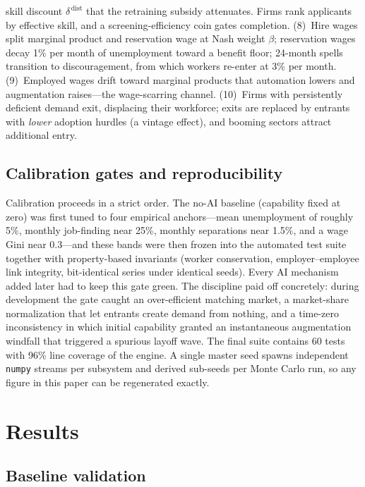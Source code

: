 \documentclass[11pt,a4paper]{article}
\begin{document}
skill discount $\delta^{\,\text{dist}}$ that the retraining subsidy attenuates. Firms
rank applicants by effective skill, and a screening-efficiency coin gates completion.
(8)~Hire wages split marginal product and reservation wage at Nash weight $\beta$;
reservation wages decay 1\% per month of unemployment toward a benefit floor;
24-month spells transition to discouragement, from which workers re-enter at 3\% per
month. (9)~Employed wages drift toward marginal products that automation lowers and
augmentation raises---the wage-scarring channel. (10)~Firms with persistently deficient
demand exit, displacing their workforce; exits are replaced by entrants with
\emph{lower} adoption hurdles (a vintage effect), and booming sectors attract additional
entry.

\subsection{Calibration gates and reproducibility}

Calibration proceeds in a strict order. The no-AI baseline (capability fixed at zero)
was first tuned to four empirical anchors---mean unemployment of roughly 5\%, monthly
job-finding near 25\%, monthly separations near 1.5\%, and a wage Gini near 0.3---and
these bands were then frozen into the automated test suite together with property-based
invariants (worker conservation, employer--employee link integrity, bit-identical
series under identical seeds). Every AI mechanism added later had to keep this gate
green. The discipline paid off concretely: during development the gate caught an
over-efficient matching market, a market-share normalization that let entrants create
demand from nothing, and a time-zero inconsistency in which initial capability granted
an instantaneous augmentation windfall that triggered a spurious layoff wave. The final
suite contains 60 tests with 96\% line coverage of the engine. A single master seed
spawns independent \texttt{numpy} streams per subsystem and derived sub-seeds per Monte
Carlo run, so any figure in this paper can be regenerated exactly.

\section{Results}

\subsection{Baseline validation}
\end{document}
